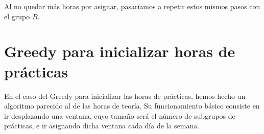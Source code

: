 Al no quedar más horas por asignar, pasaríamos a repetir estos mismos pasos con el grupo $B$.

\section{Greedy para inicializar horas de prácticas}
En el caso del Greedy para inicializar las horas de prácticas, hemos hecho un algoritmo parecido al de las horas de teoría. Su funcionamiento básico consiste en ir desplazando una ventana, cuyo tamaño será el número de subgrupos de prácticas, e ir asignando dicha ventana cada día de la semana.


